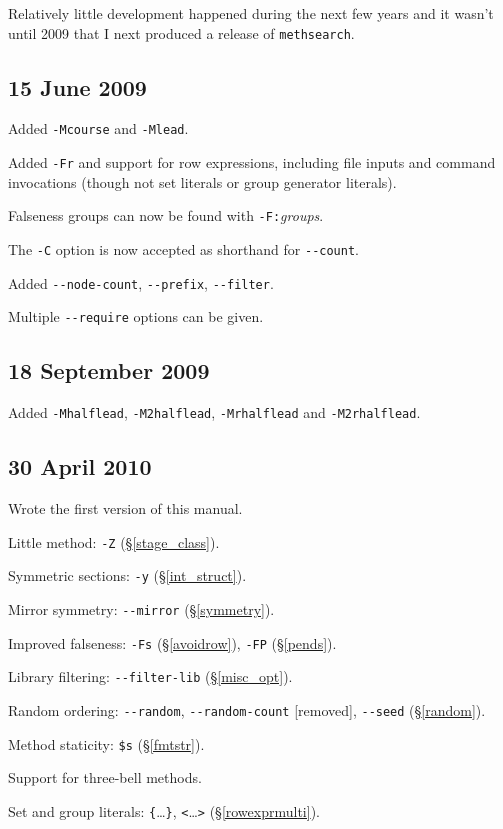 \documentclass[a4paper,11pt,oneside]{book}
\def\methsearch{\texttt{meth\-search}}
\newcommand{\sref}[1]{\hyperref[#1]{\S\ref{#1}}}
\begin{document}
Relatively little development happened during the next few years 
and it wasn't until 2009 that I next produced a release of \methsearch.

\subsection{15 June 2009}
\begin{list}{}{\leftmargin=1em\itemsep=0em}
\item Added \verb+-Mcourse+ and \verb+-Mlead+.
\item Added \verb+-Fr+ and support for row expressions, including
file inputs and command invocations (though not set literals or group 
generator literals).
\item Falseness groups can now be found with \verb+-F:+\textit{groups}.
\item The \verb+-C+ option is now accepted as shorthand for \verb+--count+.
\item Added \verb+--node-count+, \verb+--prefix+, \verb+--filter+.
\item Multiple \verb+--require+ options can be given.
\end{list}

\subsection{18 September 2009}
\begin{list}{}{\leftmargin=1em\itemsep=0em}
\item Added \verb+-Mhalflead+, \verb+-M2halflead+, \verb+-Mrhalflead+
and \verb+-M2rhalflead+.
\end{list}

\subsection{30 April 2010}
\begin{list}{}{\leftmargin=1em\itemsep=0em}
\item Wrote the first version of this manual.
\item Little method: \verb+-Z+ (\sref{stage_class}).
\item Symmetric sections: \verb+-y+ (\sref{int_struct}).
\item Mirror symmetry: \verb+--mirror+ (\sref{symmetry}).
\item Improved falseness: \verb+-Fs+ (\sref{avoidrow}), 
  \verb+-FP+ (\sref{pends}).
\item Library filtering: \verb+--filter-lib+ (\sref{misc_opt}).
\item Random ordering: \verb+--random+, \verb+--random-count+ [removed], 
  \verb+--seed+ (\S\ref{random}).
\item Method staticity: \verb+$s+ (\sref{fmtstr}).
\item Support for three-bell methods.
\item Set and group literals: \verb+{+\ldots\verb+}+, \verb+<+\ldots\verb+>+
  (\sref{rowexprmulti}).
\end{list}
\end{document}

